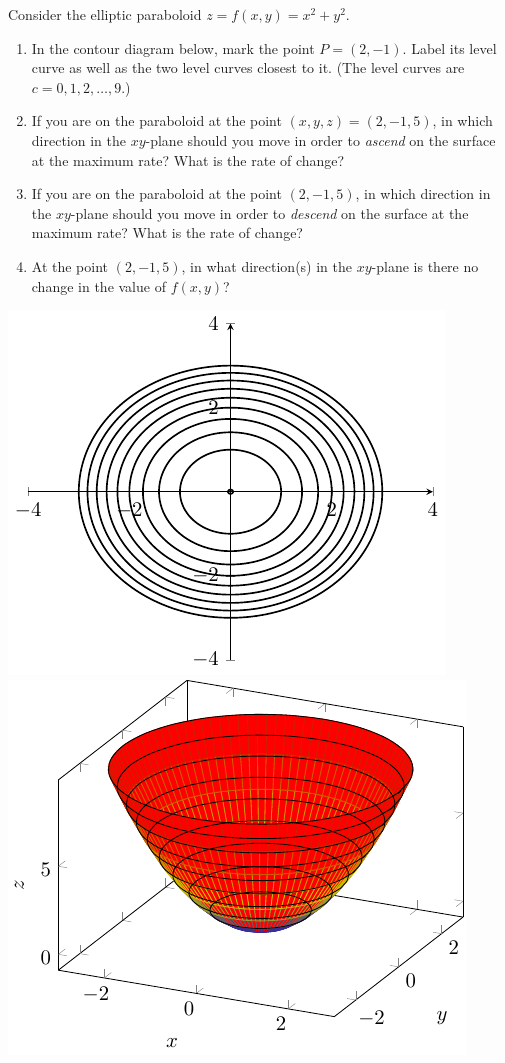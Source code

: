 \pagebreak 

\begin{ex}
    Consider the elliptic paraboloid $z=f(x,y)=x^2+y^2$.
    \begin{enumerate}
        \item In the contour diagram below, mark the point $P=(2,-1)$. Label its level curve as well as the two level curves closest to it. (The level curves are $c=0,1,2,\dots,9$.)
        \item If you are on the paraboloid at the point $(x,y,z)=(2,-1,5)$, in which direction in the $xy$-plane should you move in order to \emph{ascend} on the surface at the maximum rate? What is the rate of change? 
        \item If you are on the paraboloid at the point $(2,-1,5)$, in which direction in the $xy$-plane should you move in order to \emph{descend} on the surface at the maximum rate? What is the rate of change? 
        \item At the point $(2,-1,5)$, in what direction(s) in the $xy$-plane is there no change in the value of $f(x,y)$?
    \end{enumerate}
\end{ex}

\includegraphics[scale=1]{tikz-pictures/section-9.1-again-pic3-level-curves-elliptic-paraboloid-1.pdf} 
\hfill  
\includegraphics[scale=1]{tikz-pictures/section-9.1-again-pic3-level-curves-elliptic-paraboloid-3.pdf}\label{img:tikz-paraboloid-again}

